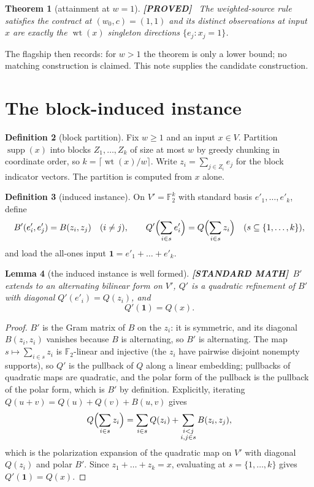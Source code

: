 \documentclass[11pt]{article}
\newtheorem{theorem}{Theorem}
\newtheorem{lemma}[theorem]{Lemma}
\theoremstyle{definition}
\newtheorem{definition}[theorem]{Definition}
\theoremstyle{remark}
\newcommand{\F}{\mathbb{F}}
\newcommand{\wt}{\operatorname{wt}}
\newcommand{\supp}{\operatorname{supp}}
\newcommand{\taglabel}[1]{\textnormal{\textbf{[#1]}}}
\newcommand{\PROVED}{\taglabel{PROVED}}
\newcommand{\STANDARD}{\taglabel{STANDARD MATH}}
\begin{document}
\begin{theorem}[attainment at $w=1$]\label{thm:attain}
\PROVED~\cite[optimal observation support]{goldarf}
The weighted-source rule satisfies the contract at $(w_0,c)=(1,1)$ and
its distinct observations at input $x$ are exactly the $\wt(x)$
singleton directions $\{e_j:x_j=1\}$.
\end{theorem}

The flagship then records: for $w>1$ the theorem is only a lower bound;
no matching construction is claimed.  This note supplies the candidate
construction.

\section{The block-induced instance}

\begin{definition}[block partition]\label{def:blocks}
Fix $w\geq1$ and an input $x\in V$.  Partition $\supp(x)$ into blocks
$Z_1,\dots,Z_k$ of size at most $w$ by greedy chunking in coordinate
order, so $k=\lceil\wt(x)/w\rceil$.  Write $z_i=\sum_{j\in Z_i}e_j$ for
the block indicator vectors.  The partition is computed from $x$ alone.
\end{definition}

\begin{definition}[induced instance]\label{def:induced}
On $V'=\F_2^k$ with standard basis $e'_1,\dots,e'_k$, define
\[
 B'(e'_i,e'_j)=B(z_i,z_j)\quad(i\neq j),\qquad
 Q'\Bigl(\sum_{i\in s}e'_i\Bigr)=Q\Bigl(\sum_{i\in s}z_i\Bigr)
 \quad(s\subseteq\{1,\dots,k\}),
\]
and load the all-ones input $\mathbf{1}=e'_1+\dots+e'_k$.
\end{definition}

\begin{lemma}[the induced instance is well formed]\label{lem:induced}
\STANDARD\
$B'$ extends to an alternating bilinear form on $V'$, $Q'$ is a
quadratic refinement of $B'$ with diagonal $Q'(e'_i)=Q(z_i)$, and
\[
 Q'(\mathbf{1})=Q(x).
\]
\end{lemma}

\begin{proof}
$B'$ is the Gram matrix of $B$ on the $z_i$: it is symmetric, and its
diagonal $B(z_i,z_i)$ vanishes because $B$ is alternating, so $B'$ is
alternating.  The map $s\mapsto\sum_{i\in s}z_i$ is $\F_2$-linear and
injective (the $z_i$ have pairwise disjoint nonempty supports), so $Q'$
is the pullback of $Q$ along a linear embedding; pullbacks of quadratic
maps are quadratic, and the polar form of the pullback is the pullback
of the polar form, which is $B'$ by definition.  Explicitly, iterating
$Q(u+v)=Q(u)+Q(v)+B(u,v)$ gives
\[
 Q\Bigl(\sum_{i\in s}z_i\Bigr)
 =\sum_{i\in s}Q(z_i)+\sum_{\substack{i<j\\ i,j\in s}}B(z_i,z_j),
\]
which is the polarization expansion of the quadratic map on $V'$ with
diagonal $Q(z_i)$ and polar $B'$.  Since $z_1+\dots+z_k=x$, evaluating
at $s=\{1,\dots,k\}$ gives $Q'(\mathbf{1})=Q(x)$.
\end{proof}
\end{document}
